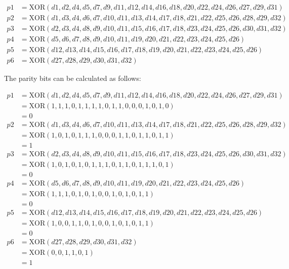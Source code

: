 \documentclass[a4paper,11pt]{article}%
\newenvironment{qanda}{\setlength{\parindent}{0pt}}{\bigskip}
\begin{document}
\begin{qanda}
	\begin{align*}
p1 &= \text{XOR}(d1, d2, d4, d5, d7, d9, d11, d12, d14, d16, d18, d20, d22, d24, d26, d27, d29, d31) \\
p2 &= \text{XOR}(d1, d3, d4, d6, d7, d10, d11, d13, d14, d17, d18, d21, d22, d25, d26, d28, d29, d32) \\
p3 &= \text{XOR}(d2, d3, d4, d8, d9, d10, d11, d15, d16, d17, d18, d23, d24, d25, d26, d30, d31, d32) \\
p4 &= \text{XOR}(d5, d6, d7, d8, d9, d10, d11, d19, d20, d21, d22, d23, d24, d25, d26) \\
p5 &= \text{XOR}(d12, d13, d14, d15, d16, d17, d18, d19, d20, d21, d22, d23, d24, d25, d26) \\
p6 &= \text{XOR}(d27, d28, d29, d30, d31, d32)
	\end{align*}


	
	The parity bits can be calculated as follows:
	
	\begin{align*}
p1 &= \text{XOR}(d1, d2, d4, d5, d7, d9, d11, d12, d14, d16, d18, d20, d22, d24, d26, d27, d29, d31) \\
&= \text{XOR}(1, 1, 1, 0, 1, 1, 1, 1, 0, 1, 1, 0, 0, 0, 1, 0, 1, 0) \\
&= 0 \\
p2 &= \text{XOR}(d1, d3, d4, d6, d7, d10, d11, d13, d14, d17, d18, d21, d22, d25, d26, d28, d29, d32) \\
&= \text{XOR}(1, 0, 1, 0, 1, 1, 1, 0, 0, 0, 1, 1, 0, 1, 1, 0, 1, 1) \\
&= 1 \\
p3 &= \text{XOR}(d2, d3, d4, d8, d9, d10, d11, d15, d16, d17, d18, d23, d24, d25, d26, d30, d31, d32) \\
&= \text{XOR}(1, 0, 1, 0, 1, 0, 1, 1, 1, 0, 1, 1, 0, 1, 1, 1, 0, 1) \\
&= 0 \\
p4 &= \text{XOR}(d5, d6, d7, d8, d9, d10, d11, d19, d20, d21, d22, d23, d24, d25, d26) \\
&= \text{XOR}(1, 1, 1, 0, 1, 0, 1, 0, 0, 1, 0, 1, 0, 1, 1) \\
&= 0 \\
p5 &= \text{XOR}(d12, d13, d14, d15, d16, d17, d18, d19, d20, d21, d22, d23, d24, d25, d26) \\
&= \text{XOR}(1, 0, 0, 1, 1, 0, 1, 0, 0, 1, 0, 1, 0, 1, 1) \\
&= 0 \\
p6 &= \text{XOR}(d27, d28, d29, d30, d31, d32) \\
&= \text{XOR}(0, 0, 1, 1, 0, 1) \\
&= 1
	\end{align*}
	

\end{qanda}
\end{document}
